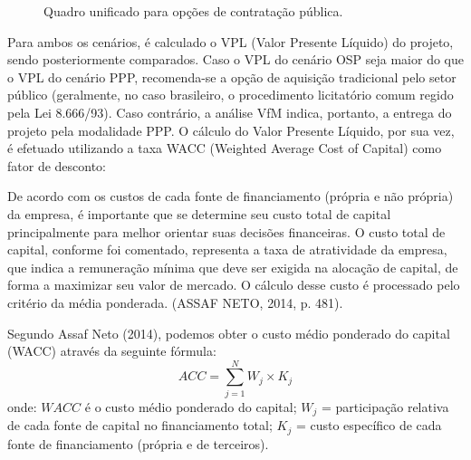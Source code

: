 \begin{figure}[ht!]
    \centering
    \caption{Quadro unificado para opções de contratação pública.}
    \label{fig:estrutura-de-impostos}
\end{figure}

Para ambos os cenários, é calculado o VPL (Valor Presente Líquido) do projeto, sendo posteriormente comparados. Caso o VPL do cenário OSP seja maior do que o VPL do cenário PPP, recomenda-se a opção de aquisição tradicional pelo setor público (geralmente, no caso brasileiro, o procedimento licitatório comum regido pela Lei 8.666/93). Caso contrário, a análise VfM indica, portanto, a entrega do projeto pela modalidade PPP. O cálculo do Valor Presente Líquido, por sua vez, é efetuado utilizando a taxa WACC (Weighted Average Cost of Capital) como fator de desconto:

\begin{citacao}
De acordo com os custos de cada fonte de financiamento (própria e não própria) da empresa, é importante que se determine seu custo total de capital principalmente para melhor orientar suas decisões financeiras. O custo total de capital, conforme foi comentado, representa a taxa de atratividade da empresa, que indica a remuneração mínima que deve ser exigida na alocação de capital, de forma a maximizar seu valor de mercado. O cálculo desse custo é processado pelo critério da média ponderada. (ASSAF NETO, 2014, p. 481).
\end{citacao}

Segundo Assaf Neto (2014), podemos obter o custo médio ponderado do capital (WACC) através da seguinte fórmula:
\begin{equation}
    ACC=\sum_{j=1}^{N}W_j\times K_j
\end{equation}
onde: $WACC$ é o custo médio ponderado do capital; $W_j$ = participação relativa de cada fonte de capital no financiamento total; $K_j$ = custo específico de cada fonte de financiamento (própria e de terceiros).

